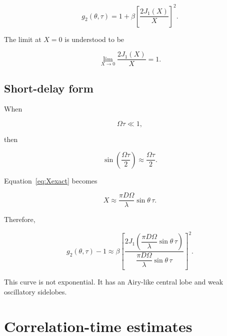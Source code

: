 \documentclass[11pt]{article}
\begin{document}
\begin{equation}
    \boxed{
    g_2(\theta,\tau)
    =
    1+
    \beta
    \left[
        \frac{2J_1(X)}{X}
    \right]^2
    }.
    \label{eq:g2exact}
\end{equation}

The limit at $X=0$ is understood to be

\begin{equation}
    \lim_{X\rightarrow0}\frac{2J_1(X)}{X}=1.
\end{equation}

\subsection{Short-delay form}

When

\begin{equation}
    \Omega\tau\ll1,
\end{equation}

then

\begin{equation}
    \sin\left(\frac{\Omega\tau}{2}\right)
    \approx
    \frac{\Omega\tau}{2}.
\end{equation}

Equation~\eqref{eq:Xexact} becomes

\begin{equation}
    X
    \approx
    \frac{\pi D\Omega}{\lambda}
    \sin\theta\,\tau.
    \label{eq:Xshort}
\end{equation}

Therefore,

\begin{equation}
    \boxed{
    g_2(\theta,\tau)-1
    \approx
    \beta
    \left[
        \frac{
            2J_1\left(
                \dfrac{\pi D\Omega}{\lambda}
                \sin\theta\,\tau
            \right)
        }{
            \dfrac{\pi D\Omega}{\lambda}
            \sin\theta\,\tau
        }
    \right]^2
    }.
    \label{eq:g2short}
\end{equation}

This curve is not exponential. It has an Airy-like central lobe and weak
oscillatory sidelobes.

\section{Correlation-time estimates}
\end{document}
